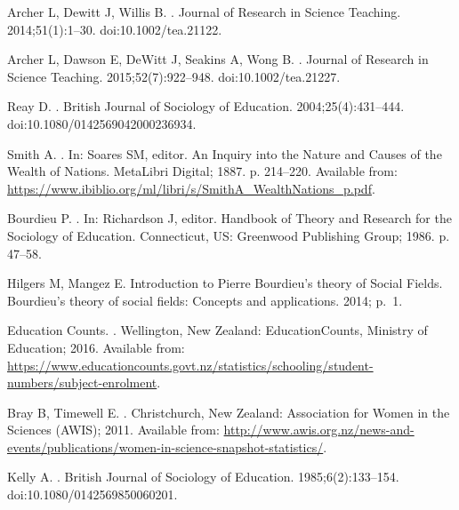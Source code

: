 \begin{thebibliography}{10}
Archer L, Dewitt J, Willis B.
.
\newblock Journal of Research in Science Teaching. 2014;51(1):1--30.
\newblock doi:{10.1002/tea.21122}.

Archer L, Dawson E, DeWitt J, Seakins A, Wong B.
.
\newblock Journal of Research in Science Teaching. 2015;52(7):922--948.
\newblock doi:{10.1002/tea.21227}.

Reay D.
.
\newblock British Journal of Sociology of Education. 2004;25(4):431--444.
\newblock doi:{10.1080/0142569042000236934}.

Smith A.
.
\newblock In: Soares SM, editor. An Inquiry into the Nature and Causes of the Wealth of Nations. MetaLibri Digital; 1887. p. 214--220.
\newblock Available from:
  \url{https://www.ibiblio.org/ml/libri/s/SmithA_WealthNations_p.pdf}.

Bourdieu P.
.
\newblock In: Richardson J, editor. Handbook of Theory and Research for the Sociology of Education. Connecticut, US: Greenwood Publishing Group; 1986. p.
  47--58.

Hilgers M, Mangez E.
\newblock Introduction to Pierre Bourdieu's theory of Social Fields.
\newblock Bourdieu's theory of social fields: Concepts and applications. 2014;
  p.~1.

{Education Counts}.
.
\newblock Wellington, New Zealand: EducationCounts, Ministry of Education;
  2016.
\newblock Available from:
  \url{https://www.educationcounts.govt.nz/statistics/schooling/student-numbers/subject-enrolment}.

Bray B, Timewell E.
.
\newblock Christchurch, New Zealand: Association for Women in the Sciences (AWIS); 2011.
\newblock Available from:
  \url{http://www.awis.org.nz/news-and-events/publications/women-in-science-snapshot-statistics/}.

Kelly A.
.
\newblock British Journal of Sociology of Education. 1985;6(2):133--154.
\newblock doi:{10.1080/0142569850060201}.


\end{thebibliography}

